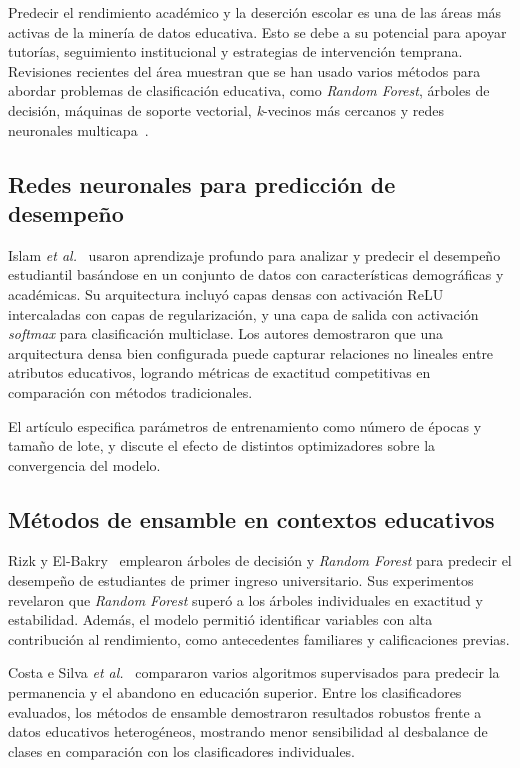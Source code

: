 \documentclass[conference]{IEEEtran}
\begin{document}
Predecir el rendimiento académico y la deserción escolar es una de las áreas más activas de la minería de datos educativa. Esto se debe a su potencial para apoyar tutorías, seguimiento institucional y estrategias de intervención temprana. Revisiones recientes del área muestran que se han usado varios métodos para abordar problemas de clasificación educativa, como \textit{Random Forest}, árboles de decisión, máquinas de soporte vectorial, \textit{k}-vecinos más cercanos y redes neuronales multicapa~\cite{review_edm,review_success}.

\subsection{Redes neuronales para predicción de desempeño}

Islam \textit{et al.}~\cite{ieeeaccess} usaron aprendizaje profundo para analizar y predecir el desempeño estudiantil basándose en un conjunto de datos con características demográficas y académicas. Su arquitectura incluyó capas densas con activación ReLU intercaladas con capas de regularización, y una capa de salida con activación \textit{softmax} para clasificación multiclase. Los autores demostraron que una arquitectura densa bien configurada puede capturar relaciones no lineales entre atributos educativos, logrando métricas de exactitud competitivas en comparación con métodos tradicionales.

El artículo especifica parámetros de entrenamiento como número de épocas y tamaño de lote, y discute el efecto de distintos optimizadores sobre la convergencia del modelo.

\subsection{Métodos de ensamble en contextos educativos}

Rizk y El-Bakry~\cite{rf_algorithms} emplearon árboles de decisión y \textit{Random Forest} para predecir el desempeño de estudiantes de primer ingreso universitario. Sus experimentos revelaron que \textit{Random Forest} superó a los árboles individuales en exactitud y estabilidad. Además, el modelo permitió identificar variables con alta contribución al rendimiento, como antecedentes familiares y calificaciones previas.

Costa e Silva \textit{et al.}~\cite{rf_dropout_review} compararon varios algoritmos supervisados para predecir la permanencia y el abandono en educación superior. Entre los clasificadores evaluados, los métodos de ensamble demostraron resultados robustos frente a datos educativos heterogéneos, mostrando menor sensibilidad al desbalance de clases en comparación con los clasificadores individuales.
\end{document}
